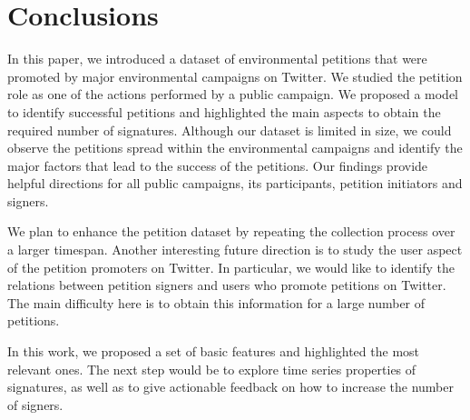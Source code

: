 \section{Conclusions}
In this paper, we introduced a dataset of environmental petitions that were promoted by major environmental campaigns on Twitter.
We studied the petition role  as one of the actions performed by a public campaign.
We proposed a model to identify successful petitions and highlighted the main aspects to obtain the required number of signatures.
Although our dataset is limited in size, we could observe the petitions spread within the environmental campaigns and identify the major factors that lead to the success of the petitions.
Our findings provide helpful directions for all public campaigns, its participants, petition initiators and signers.

We plan to enhance the petition dataset by repeating the collection process over a larger timespan.
Another interesting future direction is to study the user aspect of the petition promoters on Twitter. In particular, we would like to identify the relations between petition signers and users who promote petitions on Twitter. The main difficulty here is to obtain this information for a large number of petitions.

In this work, we proposed a set of basic features and highlighted the most relevant ones. The next step would be to explore time series properties of signatures, as well as to give actionable feedback on how to increase the number of signers.